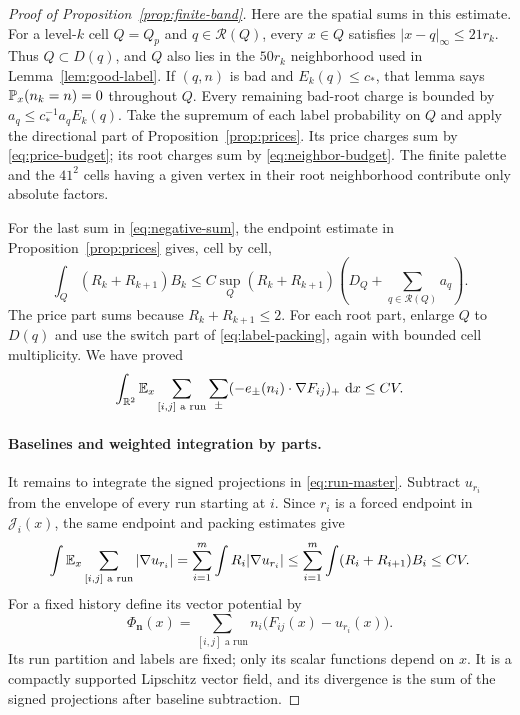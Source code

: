 \begin{proof}[Proof of Proposition~\ref{prop:finite-band}]
Here are the spatial sums in this estimate. For a level-$k$ cell
$Q=Q_p$ and $q\in\mathcal R(Q)$, every $x\in Q$ satisfies
$|x-q|_\infty\le21r_k$. Thus $Q\subset D(q)$, and $Q$ also
lies in the $50r_k$ neighborhood used in Lemma~\ref{lem:good-label}.
If $(q,n)$ is bad and $E_k(q)\le c_*$, that lemma says
$\mathbb P_x(n_k=n)=0$ throughout $Q$. Every remaining bad-root
charge is bounded by
$a_q\le c_*^{-1}a_qE_k(q)$. Take the supremum of each label
probability on $Q$ and apply the directional part of
Proposition~\ref{prop:prices}. Its price charges sum by
\eqref{eq:price-budget}; its root charges sum by
\eqref{eq:neighbor-budget}. The finite palette and the $41^2$
cells having a given vertex in their root neighborhood contribute
only absolute factors.

For the last sum in \eqref{eq:negative-sum}, the endpoint estimate
in Proposition~\ref{prop:prices} gives, cell by cell,
\[
 \int_Q(R_k+R_{k+1})B_k
 \le C\sup_Q(R_k+R_{k+1})
                \left(D_Q+\sum_{q\in\mathcal R(Q)}a_q\right).
\]
The price part sums because $R_k+R_{k+1}\le2$.
For each root part, enlarge $Q$ to $D(q)$ and use the switch
part of \eqref{eq:label-packing}, again with bounded cell
multiplicity. We have proved
\begin{equation}\label{eq:negative-integral}
 \int_{\mathbb R^2}\mathbb E_x\sum_{[i,j]\text{ a run}}\sum_\pm
       (-e_\pm(n_i)\cdot\nabla F_{ij})_+\,\mathop{}\!\mathrm{d} x\le CV.
\end{equation}

\paragraph{Baselines and weighted integration by parts.}
It remains to integrate the signed projections in
\eqref{eq:run-master}. Subtract $u_{r_i}$ from the envelope of
every run starting at $i$. Since $r_i$ is a forced endpoint in
$\mathcal J_i(x)$, the same endpoint and packing estimates give
\begin{equation}\label{eq:baseline-cost}
 \int\mathbb E_x\sum_{[i,j]\text{ a run}}|\nabla u_{r_i}|
 =\sum_{i=1}^m\int R_i|\nabla u_{r_i}|
 \le\sum_{i=1}^m\int(R_i+R_{i+1})B_i\le CV.
\end{equation}
For a fixed history define its vector potential by
\begin{equation}\label{eq:path-potential}
 \Phi_{\mathbf n}(x)=
       \sum_{[i,j]\text{ a run}}n_i\bigl(F_{ij}(x)-u_{r_i}(x)\bigr).
\end{equation}
Its run partition and labels are fixed; only its scalar functions
depend on $x$. It is a compactly supported Lipschitz vector field,
and its divergence is the sum of the signed projections after
baseline subtraction.


\end{proof}
